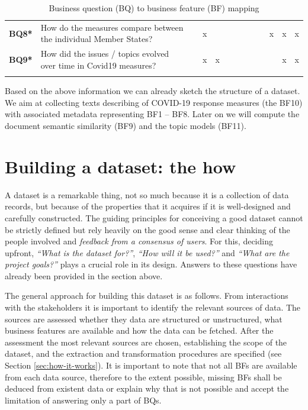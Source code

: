 \begin{landscape}
\begin{longtable}[c]{@{}cp{5cm}llllllllllc@{}}
	\textbf{BQ8*} & How do the measures compare between the individual Member States? &  & \multicolumn{1}{c}{x} &  &  &  &  &  &  & \multicolumn{1}{c}{x} & \multicolumn{1}{c}{x} & x \\
	\textbf{BQ9*} & How did the issues / topics evolved over time in Covid19 measures? &  & \multicolumn{1}{c}{x} & \multicolumn{1}{c}{x} &  &  &  &  &  &  & \multicolumn{1}{c}{x} & x \\* \bottomrule
	\caption{Business question (BQ) to business feature (BF) mapping}
	\label{tab:bq2bf}\\
\end{longtable}
\end{landscape}

Based on the above information we can already sketch the structure of a dataset. We aim at collecting texts describing of COVID-19 response measures (the BF10) with associated metadata representing BF1 -- BF8. Later on we will compute the document semantic similarity (BF9) and the topic models (BF11).

\section{Building a dataset: the how}

A dataset is a remarkable thing, not so much because it is a collection of data records, but because of the properties that it acquires if it is well-designed and carefully constructed. The guiding principles for conceiving a good dataset cannot be strictly defined but rely heavily on the good sense and clear thinking of the people involved and \textit{feedback from a consensus of users}. For this, deciding upfront, \textit{``What is the dataset for?''}, \textit{``How will it be used?''} and \textit{``What are the project goals?''} plays a crucial role in its design. Answers to these questions have already been provided in the section above. 

The general approach for building this dataset is as follows. From interactions with the stakeholders it is important to identify the relevant sources of data. The sources are assessed whether they data are structured or unstructured, what business features are available and how the data can be fetched. After the assessment the most relevant sources are chosen, establishing the scope of the dataset, and the extraction and transformation procedures are specified (see Section \ref{sec:how-it-works}). It is important to note that not all BFs are available from each data source, therefore to the extent possible, missing BFs shall be deduced from existent data or explain why that is not possible and accept the limitation of answering only a part of BQs. 

